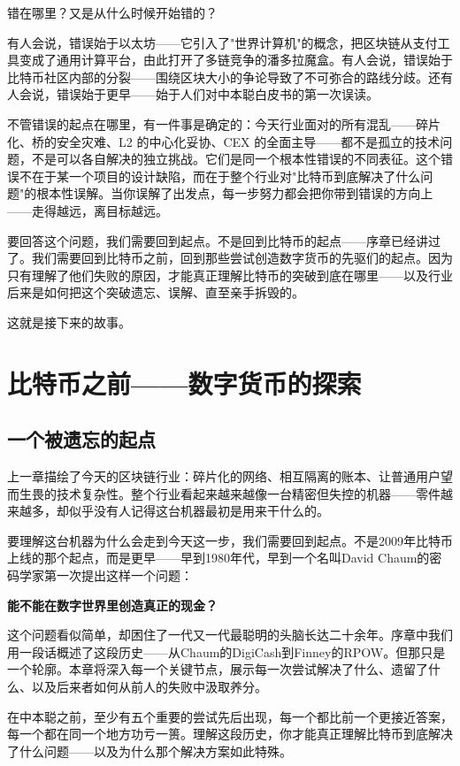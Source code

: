 \documentclass[a4paper,12pt,openany]{ctexbook}
\begin{document}
错在哪里？又是从什么时候开始错的？

有人会说，错误始于以太坊——它引入了"世界计算机"的概念，把区块链从支付工具变成了通用计算平台，由此打开了多链竞争的潘多拉魔盒。有人会说，错误始于比特币社区内部的分裂——围绕区块大小的争论导致了不可弥合的路线分歧。还有人会说，错误始于更早——始于人们对中本聪白皮书的第一次误读。

不管错误的起点在哪里，有一件事是确定的：今天行业面对的所有混乱——碎片化、桥的安全灾难、L2 的中心化妥协、CEX 的全面主导——都不是孤立的技术问题，不是可以各自解决的独立挑战。它们是同一个根本性错误的不同表征。这个错误不在于某一个项目的设计缺陷，而在于整个行业对"比特币到底解决了什么问题"的根本性误解。当你误解了出发点，每一步努力都会把你带到错误的方向上——走得越远，离目标越远。

要回答这个问题，我们需要回到起点。不是回到比特币的起点——序章已经讲过了。我们需要回到比特币之前，回到那些尝试创造数字货币的先驱们的起点。因为只有理解了他们失败的原因，才能真正理解比特币的突破到底在哪里——以及行业后来是如何把这个突破遗忘、误解、直至亲手拆毁的。

这就是接下来的故事。



\chapter{比特币之前——数字货币的探索}



\section*{一个被遗忘的起点}


上一章描绘了今天的区块链行业：碎片化的网络、相互隔离的账本、让普通用户望而生畏的技术复杂性。整个行业看起来越来越像一台精密但失控的机器——零件越来越多，却似乎没有人记得这台机器最初是用来干什么的。

要理解这台机器为什么会走到今天这一步，我们需要回到起点。不是2009年比特币上线的那个起点，而是更早——早到1980年代，早到一个名叫David Chaum的密码学家第一次提出这样一个问题：

\textbf{能不能在数字世界里创造真正的现金？}

这个问题看似简单，却困住了一代又一代最聪明的头脑长达二十余年。序章中我们用一段话概述了这段历史——从Chaum的DigiCash到Finney的RPOW。但那只是一个轮廓。本章将深入每一个关键节点，展示每一次尝试解决了什么、遗留了什么、以及后来者如何从前人的失败中汲取养分。

在中本聪之前，至少有五个重要的尝试先后出现，每一个都比前一个更接近答案，每一个都在同一个地方功亏一篑。理解这段历史，你才能真正理解比特币到底解决了什么问题——以及为什么那个解决方案如此特殊。
\end{document}
